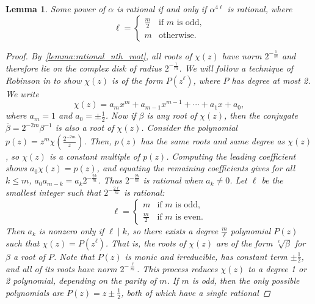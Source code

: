 \documentclass[12pt, letterpaper]{article}
\newcommand{\paren}[1]{\left(#1\right)}
\newcommand{\pfrac}[2]{\paren{\frac{#1}{#2}}}
\newtheorem{lemma}[thm]{Lemma}
\begin{document}
\begin{lemma}\label{lemma:charpoly_restriction}
    Some power of $\alpha$ is rational if and only if $\alpha^{4\ell}$ is
    rational, where
    \[
        \ell = \begin{cases}
            \frac{m}{2} & \text{if $m$ is odd,}\\
            m & \text{otherwise.}
        \end{cases}
    \]
    \begin{proof}
        By~\cref{lemma:rational_nth_root}, all roots of $\chi(z)$ have norm
        $2^{-\frac{1}{m}}$ and therefore lie on the complex disk of radius
        $2^{-\frac{1}{m}}$. We will follow a technique of Robinson in
        \cite{Robinson1969} to show $\chi(z)$ is of the form $P(z^\ell)$,
        where $P$ has degree at most 2. We write
        \[
            \chi(z) = a_m x^m + a_{m-1}x^{m-1} + \cdots + a_1 x + a_0,
        \]
        where $a_m = 1$ and $a_0 = \pm \frac{1}{2}$. Now if $\beta$ is any root
        of $\chi(z)$, then the conjugate $\overline{\beta} = 2^{-2m}
        \beta^{-1}$ is also a root of $\chi(z)$.  Consider the polynomial $p(z)
        = z^m \chi\pfrac{2^{-2m}}{z}$. Then, $p(z)$ has the same roots and same
        degree as $\chi(z)$, so $\chi(z)$ is a constant multiple of $p(z)$.
        Computing the leading coefficient shows $a_0 \chi(z) = p(z)$, and
        equating the remaining coefficients gives for all $k \le m$,
        $a_0 a_{m-k} = a_k 2^{-\frac{2k}{m}}$.  Thus $2^{-\frac{2k}{m}}$ is
        rational when $a_k \ne 0$. Let $\ell$ be the smallest integer such that
        $2^{-\frac{2\ell}{m}}$ is rational:
        \[
            \ell = \begin{cases}
                m & \text{if $m$ is odd,}\\
                \frac{m}{2} & \text{if $m$ is even.}
            \end{cases}
        \]
        Then $a_k$ is nonzero only if $\ell \mid k$, so there exists a
        degree $\frac{m}{\ell}$ polynomial $P(z)$ such that
        $\chi(z) = P\paren{z^{\ell}}$. That is, the roots of $\chi(z)$ are
        of the form $\sqrt[\ell]{\beta}$ for $\beta$ a root of $P$.
        Note that $P(z)$ is monic and irreducible, has constant term $\pm
        \frac{1}{2}$, and all of its roots have norm $2^{-\frac{\ell}{m}}$.
        This process reduces $\chi(z)$ to a degree 1 or 2 polynomial, depending
        on the parity of $m$. If $m$ is odd, then the only possible polynomials
        are $P(z) = z \pm \frac{1}{2}$, both of which have a single rational

\end{proof}
\end{lemma}
\end{document}
